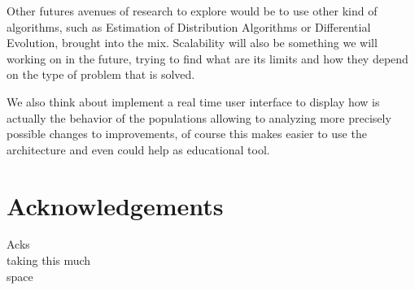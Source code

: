 \documentclass[runningheads]{llncs}
\begin{document}
Other futures avenues of research to explore would be to use other
kind of algorithms, such as Estimation of Distribution Algorithms or
Differential Evolution, brought into the mix. Scalability will also be
something we will working on in the future, trying to find what are
its limits and how they depend on the type of problem that is solved.

We also think about implement a real time user interface to display how is actually 
the behavior of the populations allowing to analyzing more precisely possible
changes to improvements, of course this makes easier to use the architecture and
even could help as educational tool.


\section*{Acknowledgements}

Acks\\
taking this much\\
space



  
\end{document}
